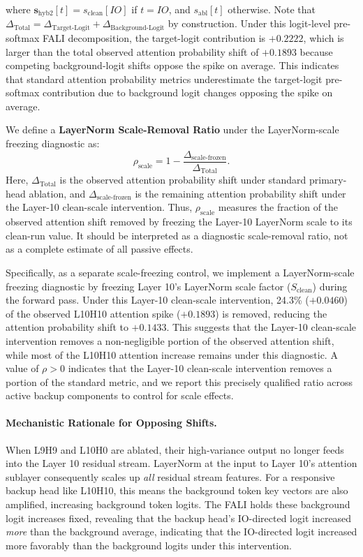 \documentclass[10pt]{article} %
\begin{document}
where $\mathbf{s}_\text{hyb2}[t] = s_\text{clean}[IO]$ if $t = IO$, and $s_\text{abl}[t]$ otherwise. Note that $\Delta_\text{Total} = \Delta_\text{Target-Logit} + \Delta_\text{Background-Logit}$ by construction. Under this logit-level pre-softmax FALI decomposition, the target-logit contribution is $+0.2222$, which is larger than the total observed attention probability shift of $+0.1893$ because competing background-logit shifts oppose the spike on average. This indicates that standard attention probability metrics underestimate the target-logit pre-softmax contribution due to background logit changes opposing the spike on average.

We define a \textbf{LayerNorm Scale-Removal Ratio} under the LayerNorm-scale freezing diagnostic as:
\begin{equation}
  \rho_\text{scale}
  =
  1 - \frac{\Delta_\text{scale-frozen}}{\Delta_\text{Total}}.
  \label{eq:scale_removal_ratio}
\end{equation}
Here, $\Delta_\text{Total}$ is the observed attention probability shift under standard primary-head ablation, and $\Delta_\text{scale-frozen}$ is the remaining attention probability shift under the Layer-10 clean-scale intervention. Thus, $\rho_\text{scale}$ measures the fraction of the observed attention shift removed by freezing the Layer-10 LayerNorm scale to its clean-run value. It should be interpreted as a diagnostic scale-removal ratio, not as a complete estimate of all passive effects.

Specifically, as a separate scale-freezing control, we implement a LayerNorm-scale freezing diagnostic by freezing Layer 10's LayerNorm scale factor ($S_\text{clean}$) during the forward pass. Under this Layer-10 clean-scale intervention, 24.3\% ($+0.0460$) of the observed L10H10 attention spike ($+0.1893$) is removed, reducing the attention probability shift to $+0.1433$. This suggests that the Layer-10 clean-scale intervention removes a non-negligible portion of the observed attention shift, while most of the L10H10 attention increase remains under this diagnostic. A value of $\rho > 0$ indicates that the Layer-10 clean-scale intervention removes a portion of the standard metric, and we report this precisely qualified ratio across active backup components to control for scale effects.

\paragraph{Mechanistic Rationale for Opposing Shifts.} When L9H9 and L10H0 are
ablated, their high-variance output no longer feeds into the Layer 10 residual
stream. LayerNorm at the input to Layer 10's attention sublayer consequently
scales up \emph{all} residual stream features. For a responsive backup head like
L10H10, this means the background token key vectors are also amplified,
increasing background token logits. The FALI holds these background logit
increases fixed, revealing that the backup head's IO-directed logit increased
\emph{more} than the background average, indicating that the IO-directed logit increased more favorably than the background logits under this intervention.
\end{document}
